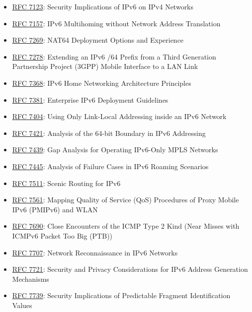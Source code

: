 \documentclass[
]{article}
\begin{document}
\begin{itemize}
\item
  \href{https://www.rfc-editor.org/info/rfc7123}{RFC 7123}: Security
  Implications of IPv6 on IPv4 Networks
\item
  \href{https://www.rfc-editor.org/info/rfc7157}{RFC 7157}: IPv6
  Multihoming without Network Address Translation
\item
  \href{https://www.rfc-editor.org/info/rfc7269}{RFC 7269}: NAT64
  Deployment Options and Experience
\item
  \href{https://www.rfc-editor.org/info/rfc7278}{RFC 7278}: Extending an
  IPv6 /64 Prefix from a Third Generation Partnership Project (3GPP)
  Mobile Interface to a LAN Link
\item
  \href{https://www.rfc-editor.org/info/rfc7368}{RFC 7368}: IPv6 Home
  Networking Architecture Principles
\item
  \href{https://www.rfc-editor.org/info/rfc7381}{RFC 7381}: Enterprise
  IPv6 Deployment Guidelines
\item
  \href{https://www.rfc-editor.org/info/rfc7404}{RFC 7404}: Using Only
  Link-Local Addressing inside an IPv6 Network
\item
  \href{https://www.rfc-editor.org/info/rfc7421}{RFC 7421}: Analysis of
  the 64-bit Boundary in IPv6 Addressing
\item
  \href{https://www.rfc-editor.org/info/rfc7439}{RFC 7439}: Gap Analysis
  for Operating IPv6-Only MPLS Networks
\item
  \href{https://www.rfc-editor.org/info/rfc7445}{RFC 7445}: Analysis of
  Failure Cases in IPv6 Roaming Scenarios
\item
  \href{https://www.rfc-editor.org/info/rfc7511}{RFC 7511}: Scenic
  Routing for IPv6
\item
  \href{https://www.rfc-editor.org/info/rfc7561}{RFC 7561}: Mapping
  Quality of Service (QoS) Procedures of Proxy Mobile IPv6 (PMIPv6) and
  WLAN
\item
  \href{https://www.rfc-editor.org/info/rfc7690}{RFC 7690}: Close
  Encounters of the ICMP Type 2 Kind (Near Misses with ICMPv6 Packet Too
  Big (PTB))
\item
  \href{https://www.rfc-editor.org/info/rfc7707}{RFC 7707}: Network
  Reconnaissance in IPv6 Networks
\item
  \href{https://www.rfc-editor.org/info/rfc7721}{RFC 7721}: Security and
  Privacy Considerations for IPv6 Address Generation Mechanisms
\item
  \href{https://www.rfc-editor.org/info/rfc7739}{RFC 7739}: Security
  Implications of Predictable Fragment Identification Values

\end{itemize}
\end{document}
